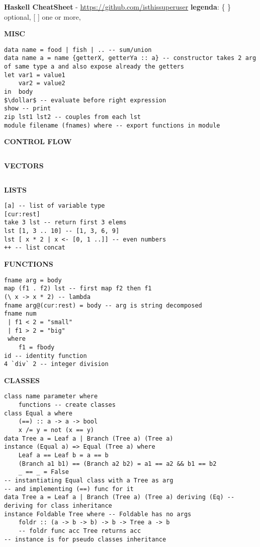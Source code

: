 \documentclass{article}
\newcommand{\dollar}{\mbox{\textdollar}}
\begin{document}
\textbf{Haskell CheatSheet} - \href{https://github.com/isthissuperuser}{https://github.com/isthissuperuser} \textbar{ }  \textbf{legenda}: \{ \} optional, [ ] one or more, 
\begin{multicols*}{3}

\hrulefill

\textbf{MISC}
\begin{lstlisting}
data name = food | fish | .. -- sum/union
data name a = name {getterX, getterYa :: a} -- constructor takes 2 arg of same type a and also expose already the getters
let var1 = value1
    var2 = value2
in  body
$\dollar$ -- evaluate before right expression
show -- print
zip lst1 lst2 -- couples from each lst
module filename (fnames) where -- export functions in module
\end{lstlisting}

\hrulefill

\textbf{CONTROL FLOW}
\begin{lstlisting}
\end{lstlisting}

\hrulefill

\textbf{VECTORS}
\begin{lstlisting}
\end{lstlisting}

\hrulefill

\textbf{LISTS}
\begin{lstlisting}
[a] -- list of variable type
[cur:rest]
take 3 lst -- return first 3 elems 
lst [1, 3 .. 10] -- [1, 3, 6, 9]
lst [ x * 2 | x <- [0, 1 ..]] -- even numbers
++ -- list concat
\end{lstlisting}

\hrulefill

\textbf{FUNCTIONS}
\begin{lstlisting}
fname arg = body
map (f1 . f2) lst -- first map f2 then f1
(\ x -> x * 2) -- lambda
fname arg@(cur:rest) = body -- arg is string decomposed
fname num
 | f1 < 2 = "small"
 | f1 > 2 = "big"
 where
    f1 = fbody
id -- identity function
4 `div` 2 -- integer division
\end{lstlisting}

\hrulefill

\textbf{CLASSES}
\begin{lstlisting}
class name parameter where
    functions -- create classes
class Equal a where
    (==) :: a -> a -> bool
    x /= y = not (x == y)
data Tree a = Leaf a | Branch (Tree a) (Tree a)
instance (Equal a) => Equal (Tree a) where
    Leaf a == Leaf b = a == b
    (Branch a1 b1) == (Branch a2 b2) = a1 == a2 && b1 == b2
    _ == _ = False
-- instantiating Equal class with a Tree as arg
-- and implementing (==) func for it
data Tree a = Leaf a | Branch (Tree a) (Tree a) deriving (Eq) -- deriving for class inheritance 
instance Foldable Tree where -- Foldable has no args
    foldr :: (a -> b -> b) -> b -> Tree a -> b
    -- foldr func acc Tree returns acc
-- instance is for pseudo classes inheritance
\end{lstlisting}


\end{multicols*}
\end{document}
